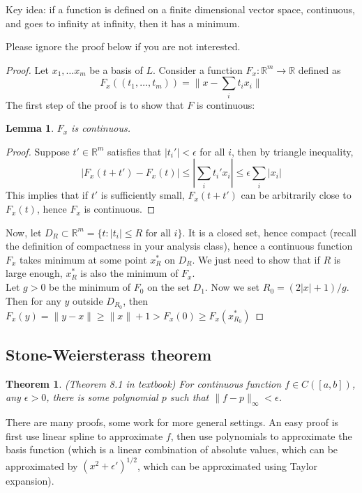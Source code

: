 \documentclass{article} %
\theoremstyle{break}
\newtheorem{lem}[definition]{Lemma}
\newtheorem{thm}[definition]{Theorem}
\begin{document}
Key idea: if a function is defined on a finite dimensional vector space, continuous, and goes to infinity at infinity, then it has a minimum.


Please ignore the proof below if you are not interested.

\begin{proof}
  Let $x_1, \dots x_m$ be a basis of $L$. Consider a function $F_x: \mathbb{R}^m\rightarrow \mathbb{R}$ defined as
  \[F_x((t_1, \dots, t_m))=\|x-\sum_i t_ix_i\|\]
  The first step of the proof is to show that $F$ is continuous:
  \begin{lem}\label{cont} $F_x$ is continuous.\end{lem}
  \begin{proof}
  Suppose $t'\in\mathbb{R}^m$ satisfies that $|t_i'|<\epsilon$ for all $i$, then by triangle inequality,
  \[|F_x(t+t')-F_x(t)|\leq |\sum_i t_i'x_i|\leq \epsilon\sum_i |x_i|\]
  This implies that if $t'$ is sufficiently small, $F_x(t+t')$ can be arbitrarily close to $F_x(t)$, hence $F_x$ is continuous.
\end{proof}

  
  Now, let $D_R\subset\mathbb{R}^m=\{t:|t_i|\leq R\text{ for all }i\}$. It is a closed set, hence compact (recall the definition of compactness in your analysis class), hence a continuous function $F_x$ takes minimum at some point $x^*_R$ on $D_R$. We just need to show that if $R$ is large enough, $x^*_R$ is also the minimum of $F_x$.\\

  Let $g>0$ be the minimum of $F_0$ on the set $D_1$. Now we set $R_0=(2|x|+1)/g$. Then for any $y$ outside $D_{R_0}$, then $F_x(y)=\|y-x\|\geq \|x\|+1>F_x(0)\geq F_x(x^*_{R_0})$
\end{proof}


\subsection{Stone-Weiersterass theorem}

\begin{thm} (Theorem 8.1 in textbook) For continuous function $f\in C([a, b])$, any $\epsilon>0$, there is some polynomial $p$ such that $\|f-p\|_\infty<\epsilon$.
\end{thm}

There are many proofs, some work for more general settings. An easy proof is first use linear spline to approximate $f$, then use polynomials to approximate the basis function (which is a linear combination of absolute values, which can be approximated by $(x^2+\epsilon')^{1/2}$, which can be approximated using Taylor expansion).
\end{document}
